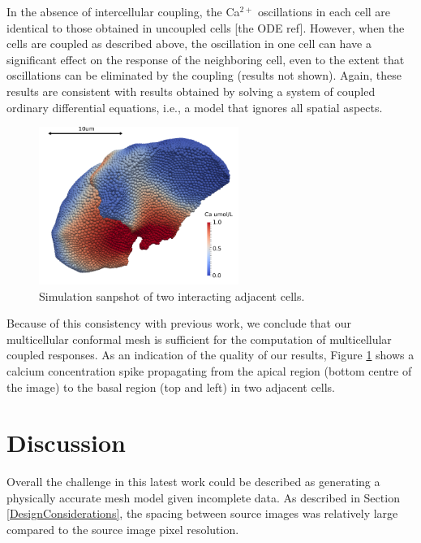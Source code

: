 \documentclass[a4paper,10pt]{article}
\begin{document}
In the absence of intercellular coupling, the Ca$^{2+}$ oscillations in each cell are identical to those obtained in uncoupled cells [the ODE ref]. However, when the cells are coupled as described above, the oscillation in one cell can have a significant effect on the response of the neighboring cell, even to the extent that oscillations can be eliminated by the coupling (results not shown). Again, these results are consistent with results obtained by solving a system of coupled ordinary differential equations, i.e., a model that ignores all spatial aspects.\\

\begin{figure}[H]
\begin{center}
\includegraphics[width=0.58\textwidth]{images/2cells_crop.pdf}
\end{center}
\caption{Simulation sanpshot of two interacting adjacent cells.}
\label{fig:two_cells}
\end{figure}

Because of this consistency with previous work, we conclude that our multicellular conformal mesh is sufficient for the computation of multicellular coupled responses.
As an indication of the quality of our results, Figure \ref{fig:two_cells} shows a calcium concentration spike propagating from the apical region (bottom centre of the image) to the basal region (top and left) in two adjacent cells.\\ 

\section{Discussion}

Overall the challenge in this latest work could be described as generating a physically accurate mesh model given incomplete data. As described in Section \ref{DesignConsiderations}, the spacing between source images was relatively large compared to the source image pixel resolution.\\
\end{document}
